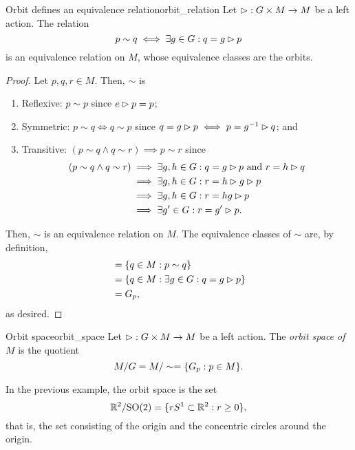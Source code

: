 \begin{proposition}{Orbit defines an equivalence relation}{orbit_relation}
    Let \(\mathbin{\vartriangleright} : G \times M \to M\) be a left action. The relation
    \begin{equation*}
        p \sim q \iff \exists g \in G : q = g \mathbin{\vartriangleright} p
    \end{equation*}
    is an equivalence relation on \(M\), whose equivalence classes are the orbits.
\end{proposition}
\begin{proof}
    Let \(p, q, r \in M\). Then, \(\sim\) is
    \begin{enumerate}[label=(\alph*)]
        \item Reflexive: \(p \sim p\) since \(e \mathbin{\vartriangleright} p = p\);
        \item Symmetric: \(p \sim q \iff q \sim p\) since \(q = g\mathbin{\vartriangleright} p \iff p = g^{-1} \mathbin{\vartriangleright} q\); and
        \item Transitive: \((p\sim q \land q \sim r) \implies p \sim r\) since
            \begin{align*}
                (p \sim q \land q \sim r) &\implies \exists g,h \in G: q = g\mathbin{\vartriangleright} p\text{ and }r = h \mathbin{\vartriangleright} q\\
                                          &\implies \exists g,h \in G : r = h\mathbin{\vartriangleright} g\mathbin{\vartriangleright} p\\
                                          &\implies \exists g,h \in G : r = hg \mathbin{\vartriangleright} p\\
                                          &\implies \exists g' \in G : r = g' \mathbin{\vartriangleright} p.
            \end{align*}
    \end{enumerate}
    Then, \(\sim\) is an equivalence relation on \(M\). The equivalence classes of \(\sim\) are, by definition,
    \begin{align*}
        [p] &= \set{ q \in M : p \sim q}\\
            &= \set {q \in M : \exists g \in G : q = g \lact p}\\
            &= G_p,
    \end{align*}
    as desired.
\end{proof}

\begin{definition}{Orbit space}{orbit_space}
    Let \(\mathbin{\vartriangleright} : G \times M \to M\) be a left action. The \emph{orbit space of \(M\)} is the quotient
    \begin{equation*}
        M/G = M/\sim = \{G_p : p \in M\}.
    \end{equation*}
\end{definition}
\begin{example}
    In the previous example, the orbit space is the set
    \begin{equation*}
        \mathbb{R}^2 / \mathrm{SO}(2) = \{rS^1 \subset \mathbb{R}^2 : r \geq 0\},
    \end{equation*}
    that is, the set consisting of the origin and the concentric circles around the origin.
\end{example}

